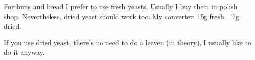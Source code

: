 \begin{recipe}
    \suggestion
    {%
        For buns and bread I prefer to use fresh yeasts. Usually I buy them in polish shop. Nevertheless, dried yeast should work too. My converter: 15g fresh ~ 7g dried.

        If you use dried yeast, there's no need to do a leaven (in theory). I usually like to do it anyway.
    }


\end{recipe}